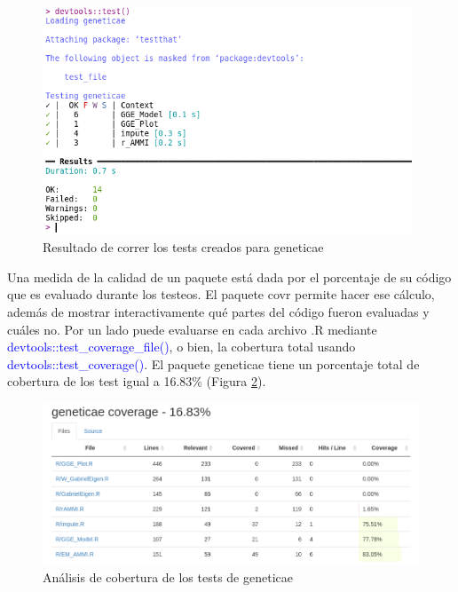  \begin{figure}[H]
	\begin{center}
		\includegraphics[width=11cm]{./Graficos/Test.png}	
	\end{center}
	\caption{Resultado de correr los tests creados para geneticae}
	\label{fig:fig34}
\end{figure}

Una medida de la calidad de un paquete está dada por el porcentaje de su código que es evaluado durante los testeos. El paquete covr permite hacer ese cálculo, además de mostrar interactivamente qué partes del código fueron evaluadas y cuáles no. Por un lado puede evaluarse en cada archivo .R mediante \textcolor{blue}{devtools::test\_coverage\_file()}, o bien, la cobertura total usando \textcolor{blue}{devtools::test\_coverage()}. El paquete geneticae tiene un porcentaje total de cobertura de los test igual a 16.83\% (Figura \ref{fig:fig35}).


 \begin{figure}[H]
	\begin{center}
		\includegraphics[width=14cm]{./Graficos/Cobertura.png}	
	\end{center}
	\caption{Análisis de cobertura de los tests de geneticae}
	\label{fig:fig35}
\end{figure}

